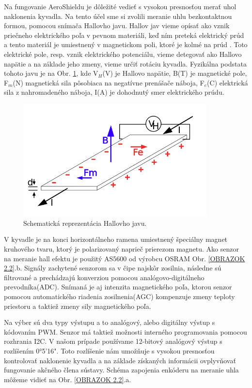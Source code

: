 Na fungovanie AeroShieldu je dôležité vedieť s vysokou presnosťou merať uhol naklonenia kyvadla. Na tento účel sme si zvolili meranie uhlu bezkontaktnou formou, pomocou snímača Hallovho javu. Hallov jav vieme opísať ako vznik priečneho elektrického poľa v pevnom materiáli, keď ním preteká elektrický prúd a tento materiál je umiestnený v magnetickom poli, ktoré je kolmé na prúd \cite{Hall}. Toto elektrické pole, resp. vznik elektrického potenciálu, vieme detegovať ako Hallovo napätie a na základe jeho zmeny, vieme určiť rotáciu kyvadla. Fyzikálna podstata tohoto javu je na Obr. \ref{OBRAZOK 1.323}, kde V$_H$(V) je Hallovo napätie, B(T) je magnetické pole, F$_m$(N) magnetická sila pôsobiaca na negatívne prenášače náboja, F$_e$(C) elektrická sila z nahromadeného náboja, I(A) je dohodnutý smer elektrického prúdu. 

\begin{figure}[!tbh]
	\centering
	\includegraphics[width=100mm]{obr/hallovjav.png}
	\caption{Schematická reprezentácia Hallovho javu.}\label{OBRAZOK 1.323}
\end{figure}

V kyvadle je na konci horizontálneho ramena umiestnený špeciálny magnet kruhového tvaru, ktorý je polarizovaný naprieč prierezom magnetu. Ako senzor na meranie hall efektu je použitý AS5600 od výrobcu OSRAM Obr. \ref{OBRAZOK 2.2}.b. Signály zachytené senzorom sa v čipe najskôr zosilnia, následne sú filtrované a prechádzajú konverziou pomocou analógovo-digitálneho prevodníka(ADC). Snímaná je aj intenzita magnetického poľa, ktorou senzor pomocou
automatického riadenia zosilnenia(AGC) kompenzuje zmeny teploty priestoru a taktiež zmeny sily magnetického poľa.

Na výber sú dva typy výstupu a to analógový, alebo digitálny výstup s kódovaním PWM. Senzor má taktiež možnosti interného programovania pomocou rozhrania I2C.
V našom prípade používame 12-bitový analógový výstup s rozlíšením 0°5'16". Toto rozlíšenie nám umožňuje s vysokou presnosťou kontrolovať naklonenie kyvadla a na základe získaných informácii ovplyvňovať fungovanie akčného člena sústavy. Schéma zapojenia enkóderu na meranie uhla môžeme vidieť na Obr. \ref{OBRAZOK 2.2}.a.



